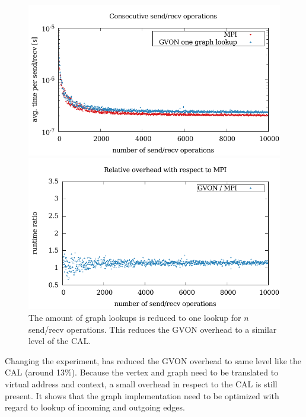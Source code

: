 \begin{figure}[H]
  \begin{minipage}[t]{0.5\textwidth} 
    \includegraphics[width=\textwidth]{plots/50_nsend_one_lookup_kepler}
  \end{minipage}%
  \begin{minipage}[t]{0.5\textwidth}
    \includegraphics[width=\textwidth]{plots/50_nsend_one_lookup_overhead_gvon_kepler}
  \end{minipage}%
  \caption{The amount of graph lookups is reduced to one lookup for
    $n$ send/recv operations.  This reduces the GVON overhead to
    a similar level of the CAL.}
  \label{fig:nsend_one_lookup_kepler}
\end{figure}


\noindent Changing the experiment, has reduced the GVON overhead to same level like
the CAL (around 13\%). Because the vertex and graph need to be
translated to virtual address and context, a small overhead in respect
to the CAL is still present. It shows that the graph implementation
need to be optimized with regard to lookup of incoming and outgoing
edges.

